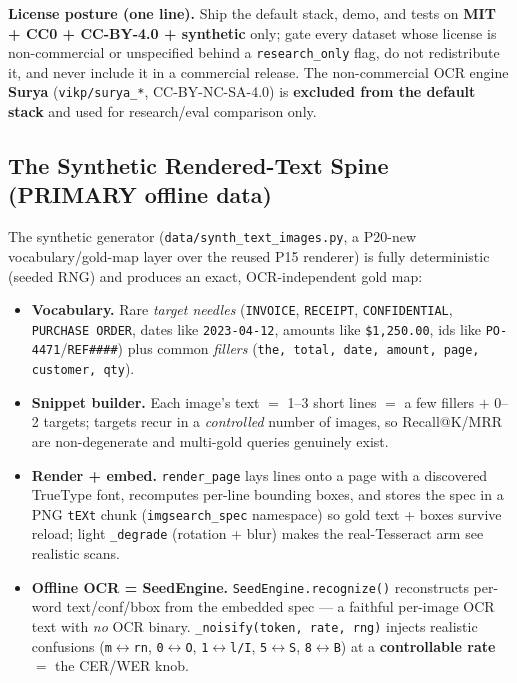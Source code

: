 \documentclass[12pt,a4paper]{article}
\begin{document}
\noindent\textbf{License posture (one line).} Ship the default stack, demo, and tests on \textbf{MIT + CC0 + CC-BY-4.0 + synthetic} only; gate every dataset whose license is non-commercial or unspecified behind a \texttt{research\_only} flag, do not redistribute it, and never include it in a commercial release. The non-commercial OCR engine \textbf{Surya} (\texttt{vikp/surya\_*}, CC-BY-NC-SA-4.0) is \textbf{excluded from the default stack} and used for research/eval comparison only.

\subsection{The Synthetic Rendered-Text Spine (PRIMARY offline data)}

The synthetic generator (\texttt{data/synth\_text\_images.py}, a P20-new vocabulary/gold-map layer over the reused P15 renderer) is fully deterministic (seeded RNG) and produces an exact, OCR-independent gold map:
\begin{itemize}\setlength\itemsep{0.12em}
  \item \textbf{Vocabulary.} Rare \emph{target needles} (\texttt{INVOICE}, \texttt{RECEIPT}, \texttt{CONFIDENTIAL}, \texttt{PURCHASE ORDER}, dates like \texttt{2023-04-12}, amounts like \texttt{\$1,250.00}, ids like \texttt{PO-4471}/\texttt{REF\#\#\#\#}) plus common \emph{fillers} (\texttt{the, total, date, amount, page, customer, qty}).
  \item \textbf{Snippet builder.} Each image's text $=$ 1--3 short lines $=$ a few fillers $+$ 0--2 targets; targets recur in a \emph{controlled} number of images, so Recall@K/MRR are non-degenerate and multi-gold queries genuinely exist.
  \item \textbf{Render + embed.} \texttt{render\_page} lays lines onto a page with a discovered TrueType font, recomputes per-line bounding boxes, and stores the spec in a PNG \texttt{tEXt} chunk (\texttt{imgsearch\_spec} namespace) so gold text + boxes survive reload; light \texttt{\_degrade} (rotation + blur) makes the real-Tesseract arm see realistic scans.
  \item \textbf{Offline OCR = SeedEngine.} \texttt{SeedEngine.recognize()} reconstructs per-word text/conf/bbox from the embedded spec --- a faithful per-image OCR text with \emph{no} OCR binary. \texttt{\_noisify(token, rate, rng)} injects realistic confusions (\texttt{m$\leftrightarrow$rn}, \texttt{0$\leftrightarrow$O}, \texttt{1$\leftrightarrow$l/I}, \texttt{5$\leftrightarrow$S}, \texttt{8$\leftrightarrow$B}) at a \textbf{controllable rate} $=$ the CER/WER knob.
\end{itemize}
\end{document}
